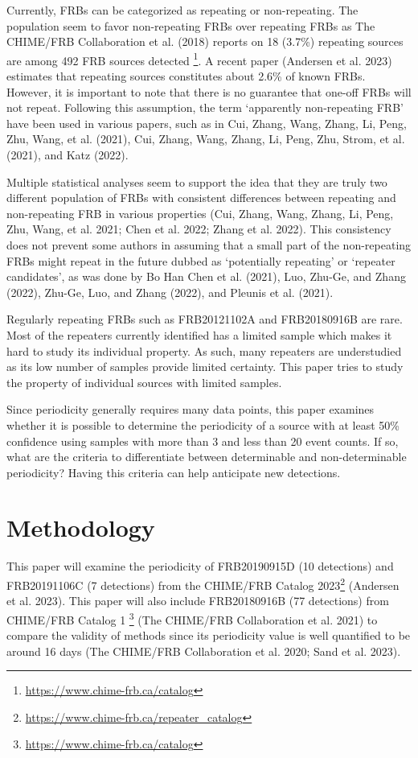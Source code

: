 \documentclass[
  rmp,
  amsmath,
  amssymb,
  preprint]{revtex4-2}
\begin{document}
Currently, FRBs can be categorized as repeating or non-repeating. The
population seem to favor non-repeating FRBs over repeating FRBs as The
CHIME/FRB Collaboration et al. (2018) reports on 18 (3.7\%) repeating
sources are among 492 FRB sources detected \footnote{\url{https://www.chime-frb.ca/catalog}}.
A recent paper (Andersen et al. 2023) estimates that repeating sources
constitutes about 2.6\% of known FRBs. However, it is important to note
that there is no guarantee that one-off FRBs will not repeat. Following
this assumption, the term `apparently non-repeating FRB' have been used
in various papers, such as in Cui, Zhang, Wang, Zhang, Li, Peng, Zhu,
Wang, et al. (2021), Cui, Zhang, Wang, Zhang, Li, Peng, Zhu, Strom, et
al. (2021), and Katz (2022).

Multiple statistical analyses seem to support the idea that they are
truly two different population of FRBs with consistent differences
between repeating and non-repeating FRB in various properties (Cui,
Zhang, Wang, Zhang, Li, Peng, Zhu, Wang, et al. 2021; Chen et al. 2022;
Zhang et al. 2022). This consistency does not prevent some authors in
assuming that a small part of the non-repeating FRBs might repeat in the
future dubbed as `potentially repeating' or `repeater candidates', as
was done by Bo Han Chen et al. (2021), Luo, Zhu-Ge, and Zhang (2022),
Zhu-Ge, Luo, and Zhang (2022), and Pleunis et al. (2021).

Regularly repeating FRBs such as FRB20121102A and FRB20180916B are rare.
Most of the repeaters currently identified has a limited sample which
makes it hard to study its individual property. As such, many repeaters
are understudied as its low number of samples provide limited certainty.
This paper tries to study the property of individual sources with
limited samples.

Since periodicity generally requires many data points, this paper
examines whether it is possible to determine the periodicity of a source
with at least 50\% confidence using samples with more than 3 and less
than 20 event counts. If so, what are the criteria to differentiate
between determinable and non-determinable periodicity? Having this
criteria can help anticipate new detections.

\hypertarget{methodology}{%
\section{Methodology}\label{methodology}}

This paper will examine the periodicity of FRB20190915D (10 detections)
and FRB20191106C (7 detections) from the CHIME/FRB Catalog
2023\footnote{\url{https://www.chime-frb.ca/repeater_catalog}} (Andersen
et al. 2023). This paper will also include FRB20180916B (77 detections)
from CHIME/FRB Catalog 1 \footnote{\url{https://www.chime-frb.ca/catalog}}
(The CHIME/FRB Collaboration et al. 2021) to compare the validity of
methods since its periodicity value is well quantified to be around 16
days (The CHIME/FRB Collaboration et al. 2020; Sand et al. 2023).
\end{document}
